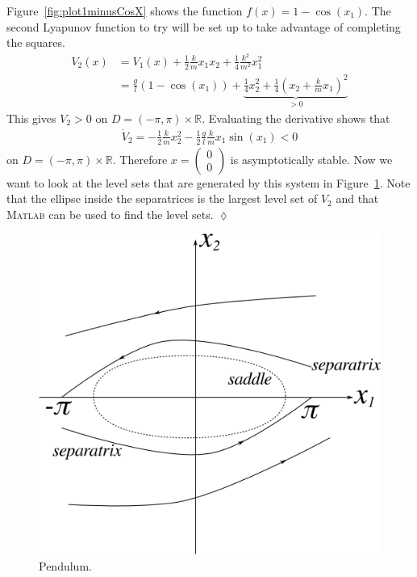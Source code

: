 \begin{example}
Figure~\ref{fig:plot1minusCosX} shows the function $f(x) = 1-\cos(x_1)$.
The second Lyapunov function to try will be set up to take advantage of completing the squares.
\begin{align*}
V_2(x) &= V_1(x) + \tfrac{1}{2}\tfrac{k}{m}x_1x_2 + \tfrac{1}{4}\tfrac{k^2}{m^2}x_1^2 \\
       &= \tfrac{g}{l}(1-\cos(x_1)) + \underbrace{\tfrac{1}{4}x_2^2 + \tfrac{1}{4}{(x_2+\tfrac{k}{m}x_1)}^2}_{>0}
\end{align*}
This gives $V_2>0$ on $D=(-\pi,\pi)\times\mathbb{R}$.
Evaluating the derivative shows that
\begin{align*}
\dot{V}_2 = -\tfrac{1}{2}\tfrac{k}{m}x_2^2 - \tfrac{1}{2}\tfrac{g}{l}\tfrac{k}{m}x_1\sin(x_1) < 0
\end{align*}
on $D=(-\pi,\pi)\times\mathbb{R}$.
Therefore $x=\left(\begin{array}{c} 0 \\ 0 \end{array}\right)$ is asymptotically stable.
Now we want to look at the level sets that are generated by this system in Figure~\ref{fig:09separatrix}.
Note that the ellipse inside the separatrices is the largest level set of $V_2$ and that \textsc{Matlab} can be used to find the level sets.
$\lozenge$
\end{example}

\begin{figure}[ht!]
\centering
\includegraphics[width=.5\textwidth]{images/09separatrix}
\caption{Pendulum.}
\label{fig:09separatrix}
\end{figure}%
